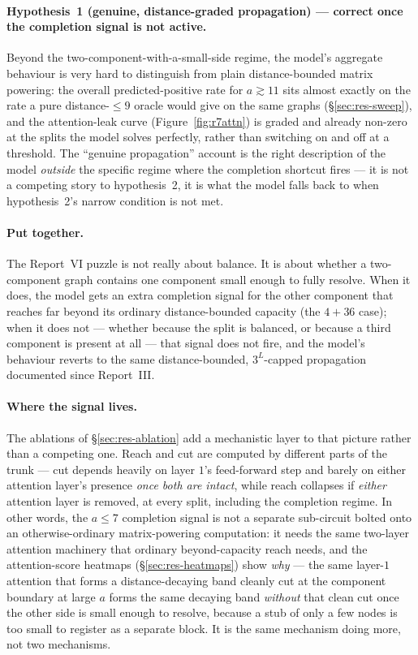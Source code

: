 \documentclass[11pt,a4paper]{article}
\begin{document}
\paragraph{Hypothesis~1 (genuine, distance-graded propagation) --- correct once
the completion signal is not active.} Beyond the two-component-with-a-small-side
regime, the model's aggregate behaviour is very hard to distinguish from plain
distance-bounded matrix powering: the overall predicted-positive rate for
$a\gtrsim11$ sits almost exactly on the rate a pure distance-$\le9$ oracle would
give on the same graphs (\S\ref{sec:res-sweep}), and the attention-leak curve
(Figure~\ref{fig:r7attn}) is graded and already non-zero at the splits the
model solves perfectly, rather than switching on and off at a threshold. The
``genuine propagation'' account is the right description of the model
\emph{outside} the specific regime where the completion shortcut fires --- it
is not a competing story to hypothesis~2, it is what the model falls back to
when hypothesis~2's narrow condition is not met.

\paragraph{Put together.} The Report~VI puzzle is not really about balance. It
is about whether a two-component graph contains one component small enough to
fully resolve. When it does, the model gets an extra completion signal for the
other component that reaches far beyond its ordinary distance-bounded capacity
(the $4{+}36$ case); when it does not --- whether because the split is
balanced, or because a third component is present at all --- that signal does
not fire, and the model's behaviour reverts to the same distance-bounded,
$3^L$-capped propagation documented since Report~III.

\paragraph{Where the signal lives.} The ablations of \S\ref{sec:res-ablation}
add a mechanistic layer to that picture rather than a competing one. Reach and
cut are computed by different parts of the trunk --- cut depends heavily on
layer $1$'s feed-forward step and barely on either attention layer's presence
\emph{once both are intact}, while reach collapses if \emph{either} attention
layer is removed, at every split, including the completion regime. In other
words, the $a\le7$ completion signal is not a separate sub-circuit bolted onto
an otherwise-ordinary matrix-powering computation: it needs the same
two-layer attention machinery that ordinary beyond-capacity reach needs, and
the attention-score heatmaps (\S\ref{sec:res-heatmaps}) show \emph{why} ---
the same layer-$1$ attention that forms a distance-decaying band cleanly cut
at the component boundary at large $a$ forms the same decaying band
\emph{without} that clean cut once the other side is small enough to
resolve, because a stub of only a few nodes is too small to register as a
separate block. It is the same mechanism doing more, not two mechanisms.
\end{document}
